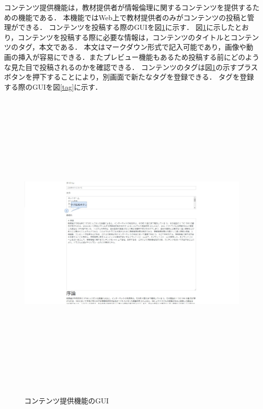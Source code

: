 コンテンツ提供機能は，教材提供者が情報倫理に関するコンテンツを提供するための機能である．
本機能ではWeb上で教材提供者のみがコンテンツの投稿と管理ができる．
コンテンツを投稿する際のGUIを図\ref{content_teikyou}に示す．
図\ref{content_teikyou}に示したとおり，コンテンツを投稿する際に必要な情報は，コンテンツのタイトルとコンテンツのタグ，本文である．
本文はマークダウン形式で記入可能であり，画像や動画の挿入が容易にできる．またプレビュー機能もあるため投稿する前にどのような見た目で投稿されるのかを確認できる．
コンテンツのタグは図\ref{content_teikyou}の示すプラスボタンを押下することにより，別画面で新たなタグを登録できる．
タグを登録する際のGUIを図\ref{tag}に示す．

\begin{figure}[htbp]
    \begin{center}
        \includegraphics[width=16cm,height=15cm,keepaspectratio]{content_teikyou-crop.pdf}\\
    \end{center}
    \caption{コンテンツ提供機能のGUI}
    \label{content_teikyou}
\end{figure}

